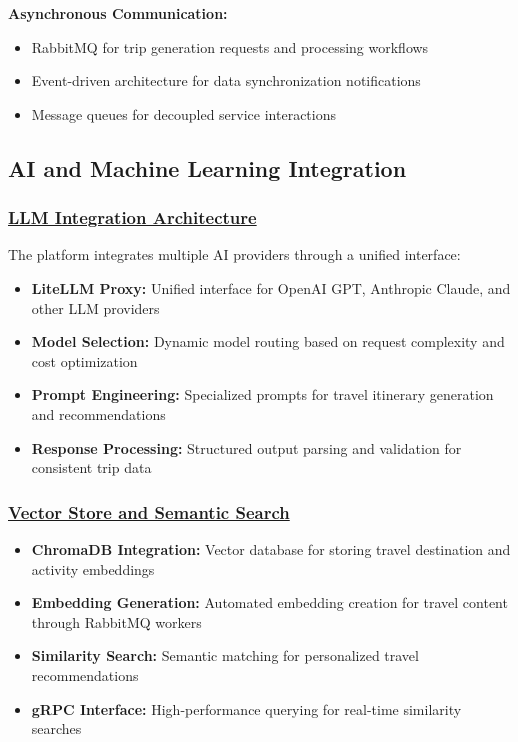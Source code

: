 \textbf{Asynchronous Communication:}
\begin{itemize}
    \item RabbitMQ for trip generation requests and processing workflows
    \item Event-driven architecture for data synchronization notifications
    \item Message queues for decoupled service interactions
\end{itemize}

\subsection{AI and Machine Learning Integration}

\subsubsection*{\underline{LLM Integration Architecture}}
The platform integrates multiple AI providers through a unified interface:

\begin{itemize}
    \item \textbf{LiteLLM Proxy:} Unified interface for OpenAI GPT, Anthropic Claude, and other LLM providers
    \item \textbf{Model Selection:} Dynamic model routing based on request complexity and cost optimization
    \item \textbf{Prompt Engineering:} Specialized prompts for travel itinerary generation and recommendations
    \item \textbf{Response Processing:} Structured output parsing and validation for consistent trip data
\end{itemize}

\subsubsection*{\underline{Vector Store and Semantic Search}}
\begin{itemize}
    \item \textbf{ChromaDB Integration:} Vector database for storing travel destination and activity embeddings
    \item \textbf{Embedding Generation:} Automated embedding creation for travel content through RabbitMQ workers
    \item \textbf{Similarity Search:} Semantic matching for personalized travel recommendations
    \item \textbf{gRPC Interface:} High-performance querying for real-time similarity searches
\end{itemize}

